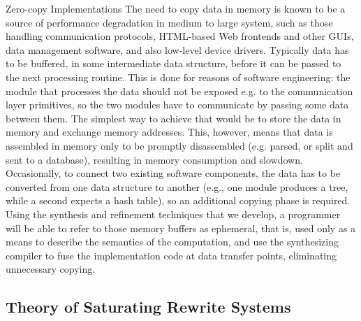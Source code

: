 \begin{paragraph}{Zero-copy Implementations}
The need to copy data in memory is known to be a source of performance
degradation in medium to large system, such as those handling communication
protocols, HTML-based Web frontends and other GUIs, data management software,
and also low-level device drivers.
Typically data has to be buffered, in some intermediate data structure,
before it can be passed to the next processing routine.
This is done for reasons of software engineering: the module that processes
the data should not be exposed e.g. to the communication layer primitives,
so the two modules have to communicate by passing some data between
them.
The simplest way to achieve that would be to store the data in memory
and exchange memory addresses.
This, however, means that data is assembled in memory only to be promptly
disassembled (e.g. parsed, or split and sent to a database), resulting in
memory consumption and slowdown.
Occasionally, to connect two existing software components, the data
has to be converted from one data structure to another (e.g., one module
produces a tree, while a second expects a hash table), so an additional
copying phase is required.
Using the synthesis and refinement techniques that we develop, a programmer
will be able to refer to those memory buffers as ephemeral, that is, used only
as a means to describe the semantics of the computation,
and use the synthesizing compiler to fuse the implementation code at data
transfer points, eliminating unnecessary copying.
\end{paragraph}

\subsection{Theory of Saturating Rewrite Systems}

